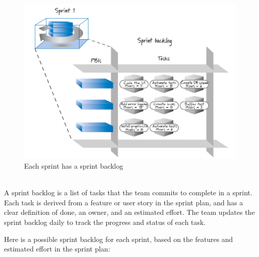 \documentclass[a4paper,12pt]{article}
\begin{document}
\begin{figure}[!h]
\centering
\includegraphics[scale=0.8]{Sprint Backlog.pdf}
\caption{Each sprint has a sprint backlog}
\label{fig:01}
\end{figure}\\
A sprint backlog is a list of tasks that the team commits to complete in a sprint. Each task is derived from a feature or user story in the sprint plan, and has a clear definition of done, an owner, and an estimated effort. The team updates the sprint backlog daily to track the progress and status of each task.

Here is a possible sprint backlog for each sprint, based on the features and estimated effort in the sprint plan:
\end{document}
